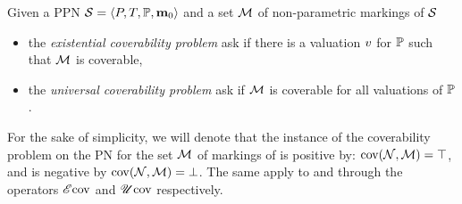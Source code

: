 \begin{defi}
  Given a \ac{PPN} $\mathcal{S} = \left\langle P, T, \mathbb{P}, \mathbf{m}_0\right\rangle$ and a set $\mathcal{M}$ of non-parametric markings of $\mathcal{S}$
  \begin{itemize}
    \item the \emph{existential coverability problem} ask if there is a valuation $\val$ for $\mathbb{P}$ such that $\mathcal{M}$ is coverable,
    \item the \emph{universal   coverability problem} ask if $\mathcal{M}$ is coverable for all valuations of $\mathbb{P}$.
  \end{itemize}
\end{defi}

For the sake of simplicity, we will denote that the instance of the coverability problem on the \ac{PN} \namePN for the set $\mathcal{M}$ of markings of \namePN is positive by: $\operatorname{cov}(\mathcal{N}, \mathcal{M}) = \top$, and is negative by $\operatorname{cov}(\mathcal{N}, \mathcal{M}) = \bot$. The same apply to \Ecov and \Ucov through the operators $\operatorname{\mathscr{E}cov}$ and $\operatorname{\mathscr{U}cov}$ respectively.

